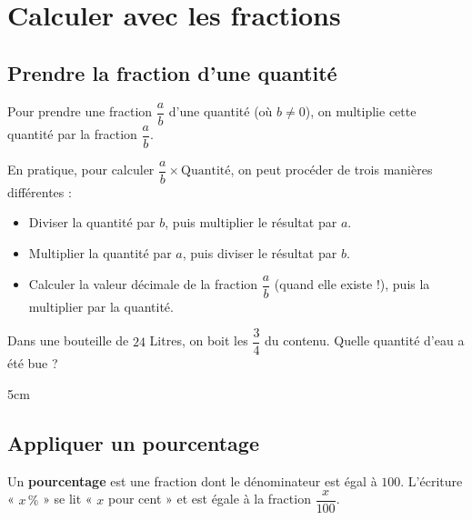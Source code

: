 \documentclass[a4paper]{book}
\begin{document}
\setcounter{chapter}{14} 
\renewcommand{\monTitre}{Calculer avec les fractions}
\chapter{\monTitre}
\thispagestyle{fancy}

\section{Prendre la fraction d'une quantité}

    \begin{propriete}
        Pour prendre une fraction $\dfrac{a}{b}$ d'une quantité (où $b \neq 0$), on multiplie cette quantité par la fraction $\dfrac{a}{b}$.
    \end{propriete}
    
    
    \begin{remarque}
        En pratique, pour calculer $\dfrac{a}{b} \times \text{Quantité}$, on peut procéder de trois manières différentes :
        \begin{itemize}
            \item Diviser la quantité par $b$, puis multiplier le résultat par $a$.
            \item Multiplier la quantité par $a$, puis diviser le résultat par $b$.
            \item Calculer la valeur décimale de la fraction $\dfrac{a}{b}$ (quand elle existe !), puis la multiplier par la quantité.
        \end{itemize}
    \end{remarque}

    
    \begin{exemple}
        Dans une bouteille de $24$ Litres, on boit les $\dfrac{3}{4}$ du contenu. Quelle quantité d'eau a été bue ?
        \begin{ZoneReponse}{5cm}
        \end{ZoneReponse}
    \end{exemple}
    
    
\section{Appliquer un pourcentage}
    
    \begin{definition}[Pourcentage]
        Un \textbf{pourcentage} est une fraction dont le dénominateur est égal à $100$. 
        L'écriture « $x\,\%$ » se lit « $x$ pour cent » et est égale à la fraction $\dfrac{x}{100}$.
    \end{definition}
\end{document}
